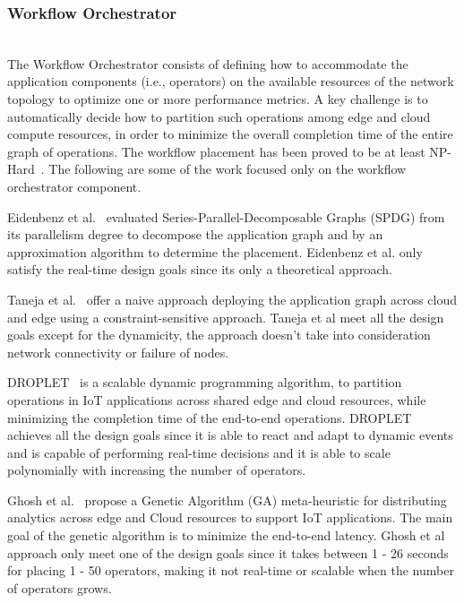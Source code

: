 \subsubsection{Workflow Orchestrator}
\hfill\\
The Workflow Orchestrator consists of defining how to accommodate the application components (i.e., operators) on the available resources of the network topology to optimize one or more performance metrics. A key challenge is to automatically decide how to partition such operations among edge and cloud compute resources, in order to minimize the overall completion time of the entire graph of operations. The workflow placement has been proved to be at least NP-Hard~\cite{Benoit:2013}. The following are some of the work focused only on the workflow orchestrator component.

Eidenbenz et al.~\cite{Eidenbenz:2016} evaluated Series-Parallel-Decomposable Graphs (SPDG) from its parallelism degree to decompose the application graph and by an approximation algorithm to determine the placement. Eidenbenz et al. only satisfy the real-time design goals since its only a theoretical approach.

Taneja et al.~\cite{Taneja:2017} offer a naive approach deploying the application graph across cloud and edge using a constraint-sensitive approach. Taneja et al meet all the design goals except for the dynamicity, the approach doesn't take into consideration network connectivity or failure of nodes.


DROPLET~\cite{8457776} is a scalable dynamic programming algorithm, to partition operations in IoT applications across shared edge and cloud resources, while minimizing the completion time of the end-to-end operations. DROPLET achieves all the design goals since it is able to react and adapt to dynamic events and is capable of performing real-time decisions and it is able to scale polynomially with increasing the number of operators. 

Ghosh et al.~\cite{Ghosh:2018} propose a Genetic Algorithm (GA) meta-heuristic for distributing analytics across edge and Cloud resources to support IoT applications. The main goal of the genetic algorithm is to minimize the end-to-end latency. Ghosh et al approach only meet one of the design goals since it takes between 1 - 26 seconds for placing 1 - 50 operators, making it not real-time or scalable when the number of operators grows.

